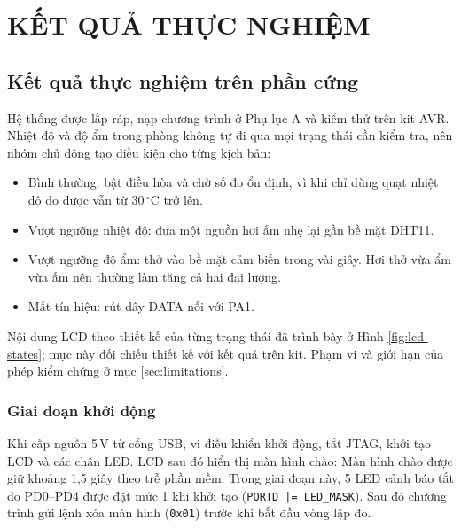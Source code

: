 \chapter{KẾT QUẢ THỰC NGHIỆM}
\label{chap:results}

\section{Kết quả thực nghiệm trên phần cứng}
\label{sec:hw-results}

Hệ thống được lắp ráp, nạp chương trình ở Phụ lục A và kiểm thử trên kit AVR. Nhiệt độ và độ ẩm trong phòng không tự đi qua mọi trạng thái cần kiểm tra, nên nhóm chủ động tạo điều kiện cho từng kịch bản:
\begin{itemize}[leftmargin=1.2cm]
    \item Bình thường: bật điều hòa và chờ số đo ổn định, vì khi chỉ dùng quạt nhiệt độ đo được vẫn từ 30\,$^\circ$C trở lên.
    \item Vượt ngưỡng nhiệt độ: đưa một nguồn hơi ấm nhẹ lại gần bề mặt DHT11.
    \item Vượt ngưỡng độ ẩm: thở vào bề mặt cảm biến trong vài giây. Hơi thở vừa ẩm vừa ấm nên thường làm tăng cả hai đại lượng.
    \item Mất tín hiệu: rút dây DATA nối với PA1.
\end{itemize}
Nội dung LCD theo thiết kế của từng trạng thái đã trình bày ở Hình \ref{fig:lcd-states}; mục này đối chiếu thiết kế với kết quả trên kit. Phạm vi và giới hạn của phép kiểm chứng ở mục \ref{sec:limitations}.

\subsection{Giai đoạn khởi động}
Khi cấp nguồn 5\,V từ cổng USB, vi điều khiển khởi động, tắt JTAG, khởi tạo LCD và các chân LED. LCD sau đó hiển thị màn hình chào:
Màn hình chào được giữ khoảng 1,5 giây theo trễ phần mềm. Trong giai đoạn này, 5 LED cảnh báo tắt do PD0--PD4 được đặt mức 1 khi khởi tạo (\texttt{PORTD |= LED\_MASK}). Sau đó chương trình gửi lệnh xóa màn hình (\texttt{0x01}) trước khi bắt đầu vòng lặp đo.

